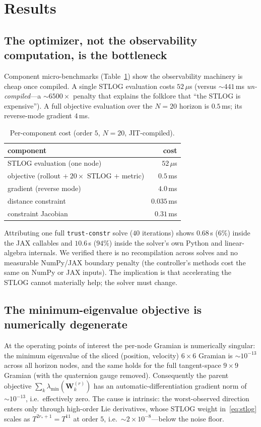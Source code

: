 \documentclass[11pt]{article}
\newcommand{\stlog}{\mathbf{W}^{(r)}}
\begin{document}
\section{Results}

\subsection{The optimizer, not the observability computation, is the bottleneck}

Component micro-benchmarks (Table~\ref{tab:components}) show the observability machinery is
cheap once compiled. A single STLOG evaluation costs $52\,\mu$s (versus ${\sim}441$\,ms
\emph{un-compiled}---a ${\sim}6500\times$ penalty that explains the folklore that ``the STLOG
is expensive''). A full objective evaluation over the $N=20$ horizon is $0.5$\,ms; its
reverse-mode gradient $4$\,ms.

\begin{table}[h]
\centering
\caption{Per-component cost (order $5$, $N=20$, JIT-compiled).}
\label{tab:components}
\begin{tabular}{lr}
\toprule
component & cost \\
\midrule
STLOG evaluation (one node) & $52\,\mu$s \\
objective (rollout $+\ 20\times$ STLOG $+$ metric) & $0.5$\,ms \\
gradient (reverse mode) & $4.0$\,ms \\
distance constraint & $0.035$\,ms \\
constraint Jacobian & $0.31$\,ms \\
\bottomrule
\end{tabular}
\end{table}

Attributing one full \texttt{trust-constr} solve ($40$ iterations) shows
$0.68$\,s ($6\%$) inside the JAX callables and $10.6$\,s ($94\%$) inside the solver's own
Python and linear-algebra internals. We verified there is no recompilation across solves and
no measurable NumPy/JAX boundary penalty (the controller's methods cost the same on NumPy or
JAX inputs). The implication is that accelerating the STLOG cannot materially help; the
solver must change.

\subsection{The minimum-eigenvalue objective is numerically degenerate}

At the operating points of interest the per-node Gramian is numerically singular: the minimum
eigenvalue of the sliced (position, velocity) $6\times6$ Gramian is ${\sim}10^{-13}$ across
all horizon nodes, and the same holds for the full tangent-space $9\times9$ Gramian (with the
quaternion gauge removed). Consequently the parent objective $\sum_k\lambda_{\min}(\stlog_k)$
has an automatic-differentiation gradient norm of ${\sim}10^{-13}$, i.e.\ effectively zero.
The cause is intrinsic: the worst-observed direction enters only through high-order Lie
derivatives, whose STLOG weight in~\eqref{eq:stlog} scales as $T^{2r_*+1}=T^{11}$ at order
$5$, i.e.\ ${\sim}2\times10^{-8}$---below the noise floor.
\end{document}
